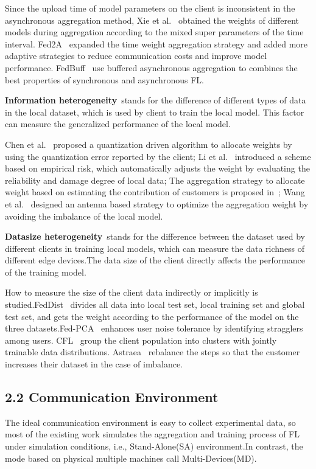 \documentclass[twoside,twocolumn]{article}
\begin{document}
\begin{spacing}{1.0}
	Since the upload time of model parameters on the client is inconsistent in the asynchronous aggregation method, Xie et al.~\cite{xie2019asynchronous} obtained the weights of different models during aggregation according to the mixed super parameters of the time interval. Fed2A~\cite{liu2022fed2a} expanded the time weight aggregation strategy and added more adaptive strategies to reduce communication costs and improve model performance. FedBuff~\cite{b26} use buffered asynchronous aggregation to combines the best properties of synchronous and asynchronous FL.

	\textbf{Information heterogeneity}\ stands for the difference of different types of data in the local dataset, which is used by client to train the local model. This factor can measure the generalized performance of the local model.
	
	Chen et al.~\cite{chen2021dynamic} proposed a quantization driven algorithm to allocate weights by using the quantization error reported by the client; Li et al.~\cite{li2021auto} introduced a scheme based on empirical risk, which automatically adjusts the weight by evaluating the reliability and damage degree of local data; The aggregation strategy to allocate weight based on estimating the contribution of customers is proposed in~\cite{wang2021reputation,b25}; Wang et al.~\cite{wang2020attention} designed an antenna based strategy to optimize the aggregation weight by avoiding the imbalance of the local model.

	\textbf{Datasize heterogeneity}\ stands for the difference between the dataset used by different clients in training local models, which can measure the data richness of different edge devices.The data size of the client directly affects the performance of the training model. 
	
	How to measure the size of the client data indirectly or implicitly is studied.FedDist~\cite{sannara2021federated} divides all data into local test set, local training set and global test set, and gets the weight according to the performance of the model on the three datasets.Fed-PCA~\cite{lv2021data} enhances user noise tolerance by identifying stragglers among users. CFL~\cite{b24} group the client population into clusters with jointly trainable data distributions. Astraea~\cite{b30} rebalance the steps so that the customer increases their dataset in the case of imbalance.
\subsection{2.2 Communication Environment}
	The ideal communication environment is easy to collect experimental data, so most of the existing work simulates the aggregation and training process of FL under simulation conditions, i.e., Stand-Alone(SA) environment.In contrast, the mode based on physical multiple machines call Multi-Devices(MD).
	

\end{spacing}
\end{document}
